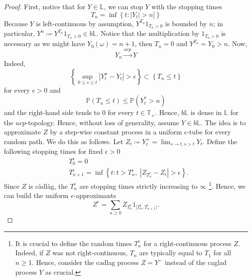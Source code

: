 \documentclass[11pt,a4paper,twoside,openany]{report}
\theoremstyle{plain} %
\theoremstyle{definition} %
\theoremstyle{remark} %
\begin{document}
\begin{proof}
 First, notice that for \(Y\in\mathbb{L}\), we can stop \(Y\) with the stopping times 
    \begin{equation}
        T_n=\inf\left\{t:|Y_t|>n]\right\}
    \end{equation}
    Because \(Y\) is left-continuous by assumption, \(Y^{T_n}1_{T_n>0}\) is bounded by \(n\); in particular, \(Y^n\coloneqq Y^{T_n}1_{T_n>0}\in b\mathbb{L}\). Notice that the multiplication by \(1_{T_n>0}\) is necessary as we might have \(Y_0(\omega)=n+1\), then \(T_n=0\) and \(Y^{T_n}=Y_0>n\). Now,
    \begin{equation}
        Y_n\overset{ucp}{\to}Y
    \end{equation}
 Indeed,
    \begin{equation}
        \left\{\sup_{0\leq s\leq t}|Y_t^n-Y_t|>\epsilon\right\}\subset \left\{T_n\leq t\right\}
    \end{equation}
    for every \(\epsilon>0\) and
    \begin{equation}
        \mathbb{P}(T_n\leq t)\leq\mathbb{P}(Y_t^*>n)
    \end{equation}
    and the right-hand side tends to \(0\) for every \(t\in\mathbb{T}_+\). Hence, \(b\mathbb{L}\) is dense in \(\mathbb{L}\) for the \(ucp\)-topology. Hence, without loss of generality, assume \(Y\in b\mathbb{L}\). The idea is to approximate \(Z\) by a step-wise constant process in a uniform \(\epsilon\)-tube for every random path. We do this as follows. Let 
    \(Z_t\coloneqq Y_t^{+}=\lim_{s\to t, s>t}Y_t\). Define the following stopping times for fixed \(\epsilon>0\)
    \begin{align*}
        &T_0^{\epsilon}=0\\
        &T_{n+1}^{\epsilon}=\inf\left\{t:t>T_{n}^{\epsilon},\;|Z _{T_{n}^{\epsilon}}-Z_t|>\epsilon\right\}.
    \end{align*}
    Since \(Z\) is càdlàg, the \(T_n^{\epsilon}\) are stopping times strictly increasing to \(\infty\) \footnote{It is crucial to define the random times \(T_n^{\epsilon}\) for a right-continuous process \(Z\). Indeed, if \(Z\) was not right-continuous, \(T_n\) are typically equal to \(T_1\) for all \(n\geq 1\). Hence, consider the cadlag process \(Z=Y^{-}\) instead of the caglad process \(Y\) as crucial.}.
 Hence, we can build the uniform \(\epsilon\)-approximants
    \begin{equation}
        Z^{\epsilon}=\sum_{n\geq 0} Z_{T_n^{\epsilon}}1_{[T_{n}^{\epsilon},T_{n+1}^{\epsilon})}.
    \end{equation}

\end{proof}
\end{document}

